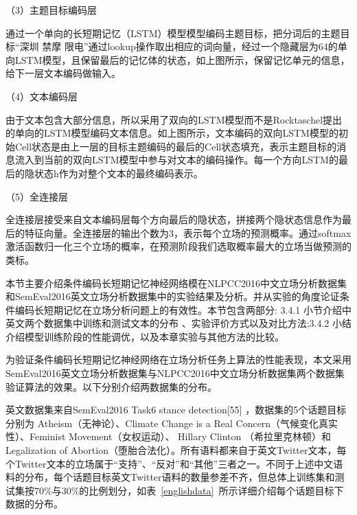 （3）主题目标编码层

通过一个单向的长短期记忆（LSTM）模型模型编码主题目标，把分词后的主题目标“深圳 禁摩 限电”通过lookup操作取出相应的词向量，经过一个隐藏层为64的单向LSTM模型，且保留最后的记忆体的状态，如上图所示，保留记忆单元的信息，给下一层文本编码做输入。

（4）文本编码层

由于文本包含大部分信息，所以采用了双向的LSTM模型而不是Rocktaschel提出的单向的LSTM模型编码文本信息。如上图所示，文本编码的双向LSTM模型的初始Cell状态是由上一层的目标主题编码的最后的Cell状态填充，表示主题目标的消息流入到当前的双向LSTM模型中参与对文本的编码操作。每一个方向LSTM的最后的隐状态h作为对整个文本的最终编码表示。

（5）全连接层


全连接层接受来自文本编码层每个方向最后的隐状态，拼接两个隐状态信息作为最后的特征向量。全连接层的输出个数为3，表示每个立场的预测概率。通过softmax激活函数归一化三个立场的概率，在预测阶段我们选取概率最大的立场当做预测的类标。


本节主要介绍条件编码长短期记忆神经网络模在NLPCC2016中文立场分析数据集和SemEval2016英文立场分析数据集中的实验结果及分析。并从实验的角度论证条件编码长短期记忆在立场分析问题上的有效性。本节包含两部分: 3.4.1 小节介绍中英文两个数据集中训练和测试文本的分布 、实验评价方式以及对比方法;3.4.2 小结介绍模型训练阶段的性能调优，以及本章实验与其他方法的比较。


为验证条件编码长短期记忆神经网络在立场分析任务上算法的性能表现，本文采用SemEval2016英文立场分析数据集与NLPCC2016中文立场分析数据集两个数据集验证算法的效果。以下分别介绍两数据集的分布。

英文数据集来自SemEval2016 Task6 stance detection[55] ，数据集的5个话题目标分别为 Atheism（无神论）、Climate Change is a Real Concern（气候变化真实性）、Feminist Movement（女权运动）、 Hillary Clinton （希拉里克林顿）和
Legalization of Abortion（堕胎合法化）。所有语料都来自于英文Twitter文本，每个Twitter文本的立场属于“支持”、“反对”和“其他”三者之一。不同于上述中文语料的分布，每个话题目标英文Twitter语料的数量参差不齐，但总体上训练集和测试集按70\%与30\%的比例划分，如表~\ref{englishdata}~所示详细介绍每个话题目标下数据的分布。

